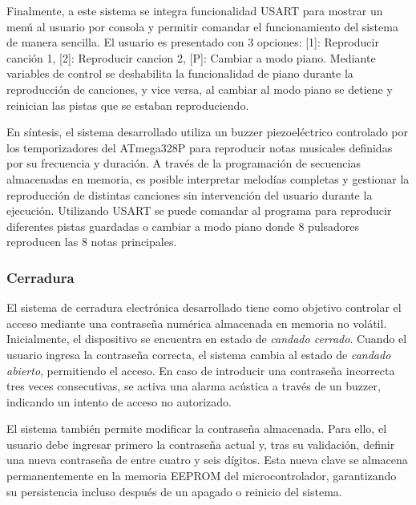    \vspace{1em}

    Finalmente, a este sistema se integra funcionalidad USART para mostrar un menú al usuario por consola y permitir comandar el funcionamiento del sistema de manera sencilla. El usuario es presentado con 3 opciones: [1]: Reproducir canción 1, [2]: Reproducir cancion 2, [P]: Cambiar a modo piano. Mediante variables de control se deshabilita la funcionalidad de piano durante la reproducción de canciones, y vice versa, al cambiar al modo piano se detiene y reinician las pistas que se estaban reproduciendo.


    \vspace{1em}

    En síntesis, el sistema desarrollado utiliza un buzzer piezoeléctrico controlado por los temporizadores del ATmega328P para reproducir notas musicales definidas por su frecuencia y duración. A través de la programación de secuencias almacenadas en memoria, es posible interpretar melodías completas y gestionar la reproducción de distintas canciones sin intervención del usuario durante la ejecución. Utilizando USART se puede comandar al programa para reproducir diferentes pistas guardadas o cambiar a modo piano donde 8 pulsadores reproducen las 8 notas principales.

    \vspace{1em}

\subsubsection{\textbf{Cerradura}}
    El sistema de cerradura electrónica desarrollado tiene como objetivo controlar el acceso mediante una contraseña numérica almacenada en memoria no volátil. Inicialmente, el dispositivo se encuentra en estado de \textit{candado cerrado}. Cuando el usuario ingresa la contraseña correcta, el sistema cambia al estado de \textit{candado abierto}, permitiendo el acceso. En caso de introducir una contraseña incorrecta tres veces consecutivas, se activa una alarma acústica a través de un buzzer, indicando un intento de acceso no autorizado.

    \vspace{1em}

    El sistema también permite modificar la contraseña almacenada. Para ello, el usuario debe ingresar primero la contraseña actual y, tras su validación, definir una nueva contraseña de entre cuatro y seis dígitos. Esta nueva clave se almacena permanentemente en la memoria EEPROM del microcontrolador, garantizando su persistencia incluso después de un apagado o reinicio del sistema.

